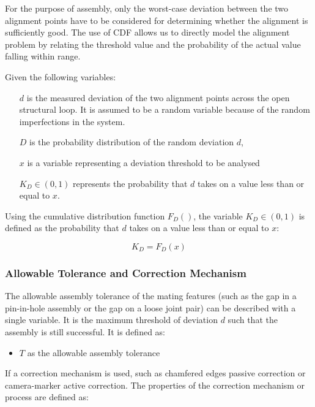 For the purpose of assembly, only the worst-case deviation between the two alignment points have to be considered for determining whether the alignment is sufficiently good. The use of CDF allows us to directly model the alignment problem by relating the threshold value and the probability of the actual value falling within range. 

Given the following variables: 

\begin{itemize}[nosep, leftmargin=20mm]
	\item [$d$] is the measured deviation of the two alignment points across the open structural loop. It is assumed to be a random variable because of the random imperfections in the system. 
	\item [$D$] is the probability distribution of the random deviation $d$, 
	\item [$x$] is a variable representing a deviation threshold to be analysed 
	\item [$K_D \in (0,1)$] represents the probability that $d$ takes on a value less than or equal to $x$. 
\end{itemize}

Using the cumulative distribution function $F_D ()$, the variable $K_D \in (0,1)$ is defined as the probability that $d$ takes on a value less than or equal to $x$: 

\begin{equation}
    K_D = F_D (x)
\end{equation}

\subsubsection{Allowable Tolerance and Correction Mechanism}
\label{subsubsection:allowable-tolerance-and-correction-mechanism}

The allowable assembly tolerance of the mating features (such as the gap in a pin-in-hole assembly or the gap on a loose joint pair) can be described with a single variable. It is the maximum threshold of deviation $d$ such that the assembly is still successful. It is defined as: 

\begin{itemize}
	\item $T$ as the allowable assembly tolerance 
\end{itemize}

If a correction mechanism is used, such as chamfered edges passive correction or camera-marker active correction. The properties of the correction mechanism or process are defined as: 

